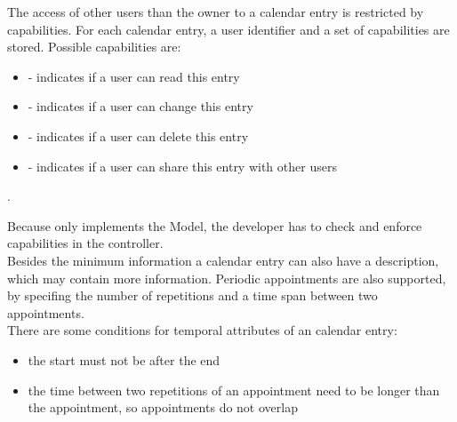 The access of other users than the owner to a calendar entry is restricted by capabilities.
For each calendar entry, a user identifier and a set of capabilities are stored.
Possible capabilities are:
\begin{itemize}
    \item {} - indicates if a user can read this entry
    \item {} - indicates if a user can change this entry
    \item {} - indicates if a user can delete this entry
    \item {} - indicates if a user can share this entry with other users
\end{itemize}.

Because \salespoint{} only implements the Model, the developer has to check and enforce capabilities in the controller.
\\

Besides the minimum information a calendar entry can also have a description, which may contain more information.
Periodic appointments are also supported, by specifing the number of repetitions and a time span between two appointments.
\\

There are some conditions for temporal attributes of an calendar entry:
\begin{itemize}
    \item the start must not be after the end
    \item the time between two repetitions of an appointment need to be longer than the appointment, so appointments do not overlap
\end{itemize}
